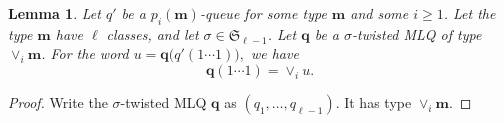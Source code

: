 \documentclass[reqno]{amsart}
\newcommand{\0}{\phantom{c}}
\newcommand{\merge}[1]{\vee_{#1}} %
\newcommand{\SymGp}[1]{\mathfrak{S}_{#1}} %
\newcommand{\mm}{\mathbf{m}}
\newcommand{\qq}{\mathbf{q}}
\newcommand{\set}[1]{\left\{ #1 \right\}}
\newcommand{\tup}[1]{\left( #1 \right)}
\theoremstyle{plain}
\newtheorem{lemma}[thm]{Lemma}
\theoremstyle{definition}
\numberwithin{equation}{section}
\begin{document}
\begin{lemma}
\label{lemma:queue_merge}
  Let $q'$ be a $p_i(\mm)$-queue for some type $\mm$ and some $i \geq 1$.
  Let the type $\mm$ have $\ell$ classes, and let $\sigma \in \SymGp{\ell-1}$.
  Let $\qq$ be a $\sigma$-twisted MLQ of type $\merge{i}\mm$.
  For the word
  $
  u = \qq\bigl( q'(1 \dotsm 1) \bigr),
  $
  we have
  \[
  \qq(1 \dotsm 1) = \merge{i} u.
  \]
\end{lemma}

\begin{proof}
\begin{comment}
Let us first show an auxiliary observation.
Let $q$, $u$ and $t$ be as in Remark~\ref{rmk:t-splitting},
and let $h \in \set{1, 2, \ldots}$.
The permutation $\tup{i_1, i_2, \ldots, i_n}$ in the construction of $q(u)$
also works for the construction of $q(\merge{h} u)$,
since $(\merge{h} u)_a \leq (\merge{h} u)_b$ whenever $u_a \leq u_b$.
Thus, the construction of $q(\merge{h} u)$ proceeds exactly as the
construction of $q(u)$, except that the letters used to build
the former word are those of $\merge{h} u$ instead of those of $u$.
This yields an expression for each letter $(q(\merge{h} u))_i$ of
$q(\merge{h} u)$ depending on whether ...
\begin{equation}
 q(\merge{h} u) = \begin{cases}
                   \merge{h} q(u) , & \text{ if } h < t ; \\
                   \merge{h+1} q(u) , & \text{ if } h \geq t
                  \end{cases} .
\label{pf.lemma:queue_merge.1}
\end{equation}
\end{comment}
Write the $\sigma$-twisted MLQ $\qq$ as $\tup{q_1, \ldots, q_{\ell-1}}$.
It has type $\merge{i} \mm$.



\end{proof}
\end{document}
